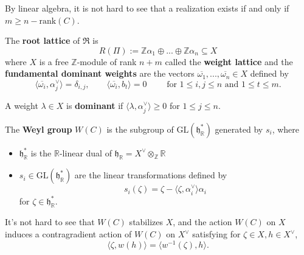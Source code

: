 By linear algebra, it is not hard to see that a realization exists if and only if $m\ge n-\text{rank}(C)$.

\begin{definition}
    The \textbf{root lattice} of $\mathfrak{R}$ is 
    \[R(\Pi) := \mathbb{Z}\alpha_1 \oplus ... \oplus \mathbb{Z}\alpha_n \subseteq X \]     
    where $X$ is a free $\mathbb{Z}$-module of rank $n+m$ called the \textbf{weight lattice} and the \textbf{fundamental dominant weights} are the vectors $\overline{\omega_1},...,\overline{\omega_n}\in X$ defined by  
    \[\langle \overline{\omega_i}, \alpha_j^\vee \rangle = \delta_{i,j}, \qquad \langle \overline{\omega_i}, b_t\rangle =0 \qquad \text{ for }1\le i,j\le n \text{ and } 1\le t\le m.\]
\end{definition}

\begin{definition}
    A weight $\lambda \in X$ is \textbf{dominant} if $\langle \lambda, \alpha_j^\vee \rangle \ge 0$ for $1\le j \le n$.
\end{definition}

\begin{definition}
    The \textbf{Weyl group} $W(C)$ is the subgroup of $\text{GL}(\mathfrak{h}_{\mathbb{R}}^*)$ generated by $s_i$, where 
    \begin{itemize}
        \item $\mathfrak{h}_{\mathbb{R}}^*$ is the $\mathbb{R}$-linear dual of $\mathfrak{h}_{\mathbb{R}} = X^\vee \otimes_{\mathbb{Z}} \mathbb{R}$ 
        \item $s_i\in \text{GL}(\mathfrak{h}_\mathbb{R}^*)$ are the linear transformations defined by
        \[s_i(\zeta) = \zeta - \langle \zeta,\alpha_i^\vee \rangle \alpha_i \]
        for $\zeta\in \mathfrak{h}_{\mathbb{R}}^*$.
    \end{itemize}
\end{definition}

It's not hard to see that $W(C)$ stabilizes $X$, and the action $W(C)$ on $X$ induces a contragradient action of $W(C)$ on $X^\vee$ satisfying for $\zeta \in X, h\in X^\vee$,
\[\langle \zeta, w(h)\rangle = \langle w^{-1}(\zeta), h\rangle.\]

\section{}